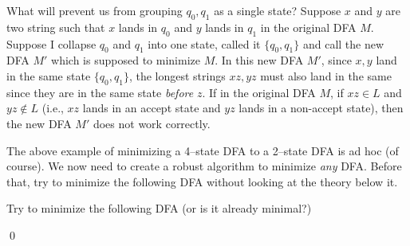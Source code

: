 What will prevent us from grouping $q_0, q_1$ as a single state?
Suppose $x$ and $y$ are two string such that
$x$ lands in $q_0$ and $y$ lands in $q_1$ in the original DFA $M$.
Suppose I collapse $q_0$ and $q_1$ into one state, called it $\{q_0, q_1\}$ and call the new DFA $M'$ which is supposed to minimize $M$.
In this new DFA $M'$, since $x,y$ land in the same state $\{q_0, q_1\}$, the longest strings $xz, yz$ must also land in the same since they are in the same state
\textit{before} $z$.
If in the original DFA $M$, if $xz \in L$ and $yz \not\in L$ (i.e., $xz$ lands in an accept state and $yz$ lands in a non-accept state), then the new DFA $M'$
does not work correctly.

The above example of minimizing a 4--state DFA to a 2--state
DFA is ad hoc (of course).
We now need to create a robust algorithm to minimize \textit{any} DFA.
Before that, try to minimize the following DFA without looking at the theory below it.

\newpage
\begin{ex}
  Try to minimize the following DFA (or is it already minimal?)

\begin{comment}

from latextool_basic import *
print(automata(layout="""
A  B  E

C  D  F
""",
edges="A,$a$,B|A,$b$,C|B,$a$,E|B,$b$,C|C,$b$,F|C,$a$,D|D,$a$,B|D,$b$,A|E,$a$,F|E,$b$,D|F,$a$,B|F,$b$,D",
A='initial|label=$q_0$',
B='label=$q_1$',
C='accept|label=$q_3$',
D='label=$q_4$',
E='label=$q_2$',
F='accept|label=$q_5$', xscale=1.3,
))
\end{python}
\end{comment}

\begin{center}
\end{center}
    
\qed
\end{ex}

